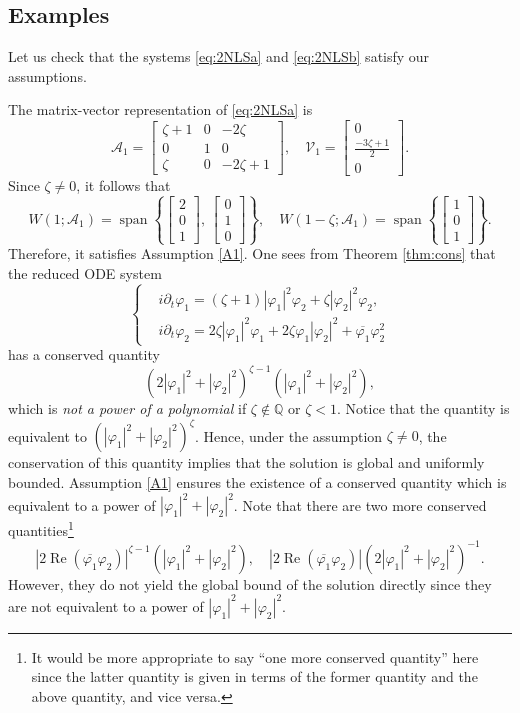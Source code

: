 \documentclass[11pt,a4paper,twosides]{amsart}
\theoremstyle{plain}
\theoremstyle{remark}
\numberwithin{equation}{section}
\renewcommand{\Re}{\operatorname{Re}}
\DeclareMathOperator{\Span}{span}
\theoremstyle{definition}
\newcommand{\1}{{\bf 1}_{\{|x| < |t|\}}}
\newcommand{\ol}{\overline}
\begin{document}
\subsection{Examples}
Let us check that the systems \eqref{eq:2NLSa} and \eqref{eq:2NLSb} satisfy our assumptions.

The matrix-vector representation of \eqref{eq:2NLSa} is
\[
	\mathscr{A}_1=\begin{bmatrix}
	\zeta+1 & 0 & -2\zeta \\
	0 & 1 & 0 \\
	\zeta & 0 & - 2\zeta+1
	\end{bmatrix}, \quad
	\mathscr{V}_1 = \begin{bmatrix} 0 \\ \frac{-3\zeta+1}2 \\ 0 \end{bmatrix}.
\]
Since $\zeta\neq0$, it follows that
\[
	W(1;\mathscr{A}_1)= \Span \left\{
	\begin{bmatrix} 2 \\ 0 \\ 1 \end{bmatrix},\,
	\begin{bmatrix} 0 \\ 1 \\ 0 \end{bmatrix}\right\}, \quad
	W(1-\zeta;\mathscr{A}_1)= \Span \left\{
	\begin{bmatrix} 1 \\ 0 \\ 1 \end{bmatrix}\right\}.
\]
Therefore, it satisfies Assumption \ref{A1}.
One sees from Theorem \ref{thm:cons} that the reduced ODE system
\[
	\left\{
  \begin{aligned}
     & i\partial_t \varphi_1  =
     (\zeta+1)|\varphi_1|^2 \varphi_2 + \zeta |\varphi_2|^2\varphi_2,  \\
     & i\partial_t \varphi_2 =
  2\zeta |\varphi_1|^2 \varphi_1+ 2\zeta \varphi_1 |\varphi_2|^2 +\ol{\varphi_1}\varphi_2^2 \end{aligned}
  \right.
\]
has a conserved quantity
\[
	(2|\varphi_1|^2+|\varphi_2|^2)^{\zeta-1} (|\varphi_1|^2+|\varphi_2|^2),
\]
which is \emph{not a power of a polynomial} if $\zeta \not\in \mathbb{Q}$ or $\zeta<1$.
Notice that the quantity is equivalent
to $ (|\varphi_1|^2+|\varphi_2|^2)^{\zeta}$.
Hence, under the assumption $\zeta\neq0$,
the conservation of this quantity implies that the solution is global and uniformly bounded.
Assumption \ref{A1} ensures the existence of a conserved quantity which is equivalent to a power of $|\varphi_1|^2 + |\varphi_2|^2$.
Note that there are two more conserved quantities\footnote{It would be more appropriate to say ``one more conserved quantity'' here since the latter quantity is given in terms of the former quantity and the above quantity, and vice versa.}
\[
	|2\Re (\overline{\varphi_1}\varphi_2)|^{\zeta-1} (|\varphi_1|^2+|\varphi_2|^2), \quad
	|2\Re (\overline{\varphi_1}\varphi_2)| (2|\varphi_1|^2+|\varphi_2|^2)^{-1}.
\]
However, they do not yield the global bound of the solution directly since they are not equivalent to a power of $|\varphi_1|^2 + |\varphi_2|^2$.
\end{document}
